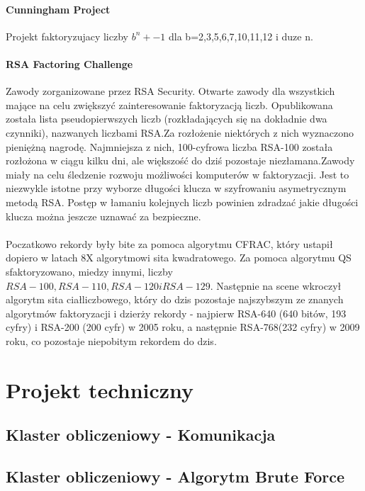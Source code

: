 \documentclass{article}
\begin{document}
\paragraph{Cunningham Project} Projekt faktoryzujacy liczby $b^n +-1$ dla b=2,3,5,6,7,10,11,12 i duze n.\cite{cun}

\paragraph{RSA Factoring Challenge} Zawody zorganizowane przez RSA Security. Otwarte zawody dla wszystkich mające na celu zwiększyć zainteresowanie faktoryzacją liczb. Opublikowana została lista pseudopierwszych liczb (rozkładających się na dokładnie dwa czynniki), nazwanych liczbami RSA.Za rozłożenie niektórych z nich wyznaczono pieniężną nagrodę. Najmniejsza z nich, 100-cyfrowa liczba RSA-100 została rozłożona w ciągu kilku dni, ale większość do dziś pozostaje niezłamana.Zawody miały na celu śledzenie rozwoju możliwości komputerów w faktoryzacji. Jest to niezwykle istotne przy wyborze długości klucza w szyfrowaniu asymetrycznym metodą RSA. Postęp w łamaniu kolejnych liczb powinien zdradzać jakie długości klucza można jeszcze uznawać za bezpieczne.\cite{rsafactoringchallenge}

\paragraph{}Poczatkowo rekordy były bite za pomoca algorytmu CFRAC, który ustapił dopiero w latach 8X algorytmowi sita kwadratowego. Za pomoca algorytmu QS sfaktoryzowano, miedzy innymi, liczby $RSA-100, RSA-110, RSA-120 i RSA-129$. Następnie na scene wkroczył algorytm sita ciałliczbowego, który do dzis pozostaje najszybszym ze znanych algorytmów faktoryzacji i dzierży rekordy - najpierw RSA-640 (640 bitów, 193 cyfry) i RSA-200 (200 cyfr) w 2005 roku, a następnie RSA-768(232 cyfry) w 2009 roku, co pozostaje niepobitym rekordem do dzis.

\section{Projekt techniczny}

\subsection{Klaster obliczeniowy - Komunikacja}


\subsection{Klaster obliczeniowy - Algorytm Brute Force}
\end{document}

